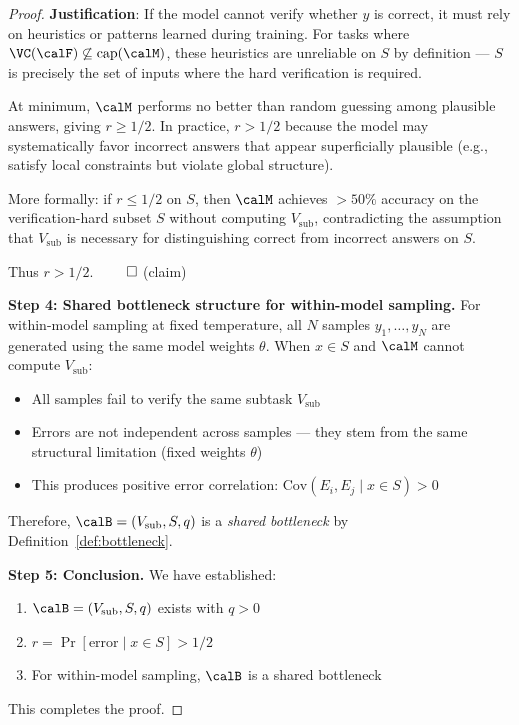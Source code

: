 \begin{proof}
\textbf{Justification}:
If the model cannot verify whether $y$ is correct, it must rely on heuristics or patterns learned during training. For tasks where $\VC(\calF) \not\subseteq \mathrm{cap}(\calM)$, these heuristics are unreliable on $S$ by definition --- $S$ is precisely the set of inputs where the hard verification is required.

At minimum, $\calM$ performs no better than random guessing among plausible answers, giving $r \geq 1/2$. In practice, $r > 1/2$ because the model may systematically favor incorrect answers that appear superficially plausible (e.g., satisfy local constraints but violate global structure).

More formally: if $r \leq 1/2$ on $S$, then $\calM$ achieves $> 50\%$ accuracy on the verification-hard subset $S$ without computing $V_{\text{sub}}$, contradicting the assumption that $V_{\text{sub}}$ is necessary for distinguishing correct from incorrect answers on $S$.

Thus $r > 1/2$. $\qed$ (claim)

\textbf{Step 4: Shared bottleneck structure for within-model sampling.}
For within-model sampling at fixed temperature, all $N$ samples $y_1, \ldots, y_N$ are generated using the same model weights $\theta$. When $x \in S$ and $\calM$ cannot compute $V_{\text{sub}}$:
\begin{itemize}
    \item All samples fail to verify the same subtask $V_{\text{sub}}$
    \item Errors are not independent across samples --- they stem from the same structural limitation (fixed weights $\theta$)
    \item This produces positive error correlation: $\mathrm{Cov}(E_i, E_j \mid x \in S) > 0$
\end{itemize}

Therefore, $\calB = (V_{\text{sub}}, S, q)$ is a \emph{shared bottleneck} by Definition~\ref{def:bottleneck}.

\textbf{Step 5: Conclusion.}
We have established:
\begin{enumerate}[label=(\alph*)]
    \item $\calB = (V_{\text{sub}}, S, q)$ exists with $q > 0$
    \item $r = \Pr[\text{error} \mid x \in S] > 1/2$
    \item For within-model sampling, $\calB$ is a shared bottleneck
\end{enumerate}
This completes the proof.
\end{proof}


